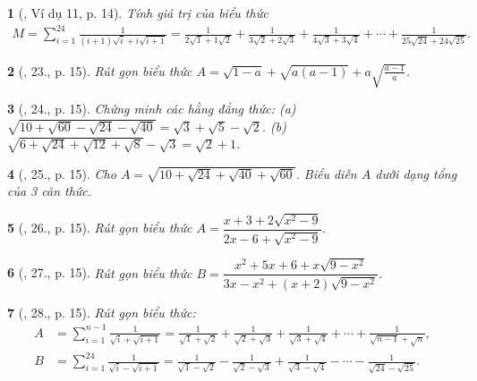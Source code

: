 \documentclass{article}
\newtheorem{baitoan}{}
\begin{document}
\begin{baitoan}[\cite{Binh_Toan_9_tap_1}, Ví dụ 11, p. 14]
	Tính giá trị của biểu thức
	\begin{align*}
		M = \sum_{i=1}^{24} \frac{1}{(i + 1)\sqrt{i} + i\sqrt{i + 1}} = \frac{1}{2\sqrt{1} + 1\sqrt{2}} + \frac{1}{3\sqrt{2} + 2\sqrt{3}} + \frac{1}{4\sqrt{3} + 3\sqrt{4}} + \cdots + \frac{1}{25\sqrt{24} + 24\sqrt{25}}.
	\end{align*}
\end{baitoan}

\begin{baitoan}[\cite{Binh_Toan_9_tap_1}, 23., p. 15]
	Rút gọn biểu thức $A = \sqrt{1 - a} + \sqrt{a(a - 1)} + a\sqrt{\frac{a - 1}{a}}$.
\end{baitoan}

\begin{baitoan}[\cite{Binh_Toan_9_tap_1}, 24., p. 15]
	Chứng minh các hằng đẳng thức: (a) $\sqrt{10 + \sqrt{60} - \sqrt{24} - \sqrt{40}} = \sqrt{3} + \sqrt{5} - \sqrt{2}$. (b) $\sqrt{6 + \sqrt{24} + \sqrt{12} + \sqrt{8}} - \sqrt{3} = \sqrt{2} + 1$.
\end{baitoan}

\begin{baitoan}[\cite{Binh_Toan_9_tap_1}, 25., p. 15]
	Cho $A = \sqrt{10 + \sqrt{24} + \sqrt{40} + \sqrt{60}}$. Biểu diễn $A$ dưới dạng tổng của 3 căn thức.
\end{baitoan}

\begin{baitoan}[\cite{Binh_Toan_9_tap_1}, 26., p. 15]
	Rút gọn biểu thức $A = \dfrac{x + 3 + 2\sqrt{x^2 - 9}}{2x - 6 + \sqrt{x^2 - 9}}$.
\end{baitoan}

\begin{baitoan}[\cite{Binh_Toan_9_tap_1}, 27., p. 15]
	Rút gọn biểu thức $B = \dfrac{x^2 + 5x + 6 + x\sqrt{9 - x^2}}{3x - x^2 + (x + 2)\sqrt{9 - x^2}}$.
\end{baitoan}

\begin{baitoan}[\cite{Binh_Toan_9_tap_1}, 28., p. 15]
	Rút gọn biểu thức:
	\begin{align*}
		A &= \sum_{i=1}^{n-1} \frac{1}{\sqrt{i} + \sqrt{i + 1}} = \frac{1}{\sqrt{1} + \sqrt{2}} + \frac{1}{\sqrt{2} + \sqrt{3}} + \frac{1}{\sqrt{3} + \sqrt{4}} + \cdots + \frac{1}{\sqrt{n - 1} + \sqrt{n}},\\
		B &= \sum_{i=1}^{24} \frac{1}{\sqrt{i} - \sqrt{i + 1}} = \frac{1}{\sqrt{1} - \sqrt{2}} - \frac{1}{\sqrt{2} - \sqrt{3}} + \frac{1}{\sqrt{3} - \sqrt{4}} - \cdots - \frac{1}{\sqrt{24} - \sqrt{25}}.
	\end{align*}
\end{baitoan}
\end{document}
